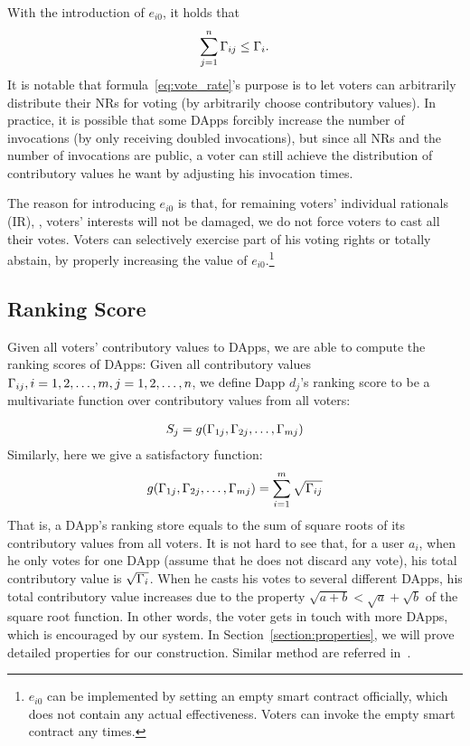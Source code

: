 With the introduction of $e_{i0}$, it holds that
$$\sum_{j=1}^n \Gamma_{ij} \leq \Gamma_i.$$
It is notable that formula~\ref{eq:vote_rate}'s purpose is to let voters can
arbitrarily distribute their NRs for voting (by arbitrarily choose contributory
values). In practice, it is possible that some DApps forcibly increase the
number of invocations (by only receiving doubled invocations), but since all
NRs and the number of invocations are public, a voter can still achieve the
distribution of contributory values he want by adjusting his invocation times.

The reason for introducing $e_{i0}$ is that, for remaining voters' individual
rationals (IR), \ie, voters' interests will not be damaged, we do not force voters to cast all their votes. Voters can selectively exercise part of his voting rights or totally abstain, by properly increasing the value of $e_{i0}$.\footnote{$e_{i0}$ can be implemented by setting an empty smart contract officially, which does not contain any actual effectiveness. Voters can invoke the empty smart contract any times.}
\subsection{Ranking Score}
\noindent Given all voters' contributory values to DApps, we are able to compute the
ranking scores of DApps: Given all contributory values
$\Gamma_{ij},i=1,2,\ldots,m,j=1,2,\ldots,n$, we define Dapp $d_j$'s ranking score to be a multivariate function over contributory values from all voters:

\begin{align}
	S_j = g(\Gamma_{1j},\Gamma_{2j},\ldots,\Gamma_{mj})
\end{align}
Similarly, here we give a satisfactory function:
\begin{align}
	\label{eq:sqrt}
	g(\Gamma_{1j},\Gamma_{2j},\ldots,\Gamma_{mj}) = \sum_{i=1}^m \sqrt{\Gamma_{ij}}
\end{align}
That is, a DApp's ranking store equals to the sum of square roots of its
contributory values from all voters. It is not hard to see that, for a user
$a_i$, when he only votes for one DApp (assume that he does not discard any
vote), his total contributory value is $\sqrt{\Gamma_i}$. When he casts his votes
to several different DApps, his total contributory value increases due to the
property $\sqrt{a+b}<\sqrt{a}+\sqrt{b}$ of the square root function. In other
words, the voter gets in touch with more DApps, which is encouraged by our
system. In Section~\ref{section:properties}, we will prove  detailed properties for our construction. Similar method are referred in~\cite{buterin2018liberal}.

